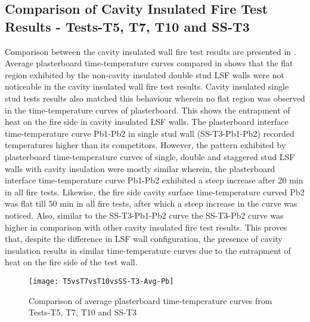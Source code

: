 \subsection{Comparison of Cavity Insulated Fire Test Results - Tests-T5, T7, T10 and SS-T3}

Comparison between the cavity insulated wall fire test results are presented in . Average plasterboard time-temperature curves compared in  shows that the flat region exhibited by the non-cavity insulated double stud LSF walls were not noticeable in the cavity insulated wall fire test results. Cavity insulated single stud tests results also matched this behaviour wherein no flat region was observed in the time-temperature curves of plasterboard. This shows the entrapment of heat on the fire side in cavity insulated LSF walls. The plasterboard interface time-temperature curve Pb1-Pb2 in single stud wall (SS-T3-Pb1-Pb2) recorded temperatures higher than its competitors. However, the pattern exhibited by plasterboard time-temperature curves of single, double and staggered stud LSF walls with cavity insulation were mostly similar wherein, the plasterboard interface time-temperature curve Pb1-Pb2 exhibited a steep increase after 20 min in all fire tests. Likewise, the fire side cavity surface time-temperature curved Pb2 was flat till 50 min in all fire tests, after which a steep increase in the curve was noticed. Also, similar to the SS-T3-Pb1-Pb2 curve the SS-T3-Pb2 curve was higher in comparison with other cavity insulated fire test results. This proves that, despite the difference in LSF wall configuration, the presence of cavity insulation results in similar time-temperature curves due to the entrapment of heat on the fire side of the test wall.
\begin{figure}[!htbp]
	\centering
		\texttt{[image: T5vsT7vsT10vsSS-T3-Avg-Pb]}  
	\caption{Comparison of average plasterboard time-temperature curves from Tests-T5, T7, T10 and SS-T3}
	\label{fig:T5vsT7vsT10vsSS-T3-Avg-Pb}
\end{figure}

